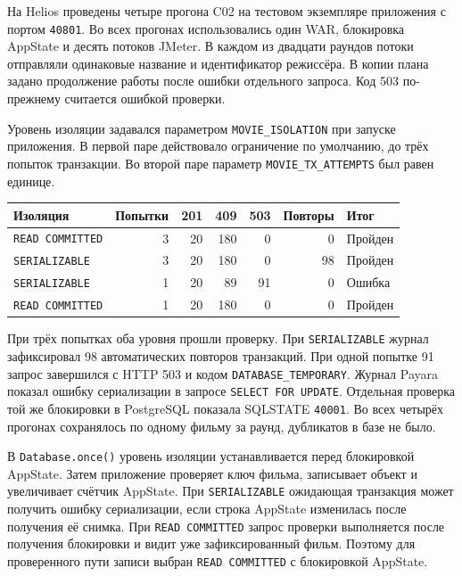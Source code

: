 На Helios проведены четыре прогона C02 на тестовом экземпляре приложения с портом \texttt{40801}. Во всех прогонах использовались один WAR, блокировка AppState и десять потоков JMeter. В каждом из двадцати раундов потоки отправляли одинаковые название и идентификатор режиссёра. В копии плана задано продолжение работы после ошибки отдельного запроса. Код 503 по-прежнему считается ошибкой проверки.

Уровень изоляции задавался параметром \texttt{MOVIE\_ISOLATION} при запуске приложения. В первой паре действовало ограничение по умолчанию, до трёх попыток транзакции. Во второй паре параметр \texttt{MOVIE\_TX\_ATTEMPTS} был равен единице.

\begin{center}
\begin{tabular}{lrrrrrl}
\toprule
Изоляция & Попытки & 201 & 409 & 503 & Повторы & Итог \\
\midrule
\texttt{READ COMMITTED} & 3 & 20 & 180 & 0 & 0 & Пройден \\
\texttt{SERIALIZABLE} & 3 & 20 & 180 & 0 & 98 & Пройден \\
\texttt{SERIALIZABLE} & 1 & 20 & 89 & 91 & 0 & Ошибка \\
\texttt{READ COMMITTED} & 1 & 20 & 180 & 0 & 0 & Пройден \\
\bottomrule
\end{tabular}
\end{center}

При трёх попытках оба уровня прошли проверку. При \texttt{SERIALIZABLE} журнал зафиксировал 98 автоматических повторов транзакций. При одной попытке 91 запрос завершился с HTTP 503 и кодом \texttt{DATABASE\_TEMPORARY}. Журнал Payara показал ошибку сериализации в запросе \texttt{SELECT FOR UPDATE}. Отдельная проверка той же блокировки в PostgreSQL показала SQLSTATE \texttt{40001}. Во всех четырёх прогонах сохранялось по одному фильму за раунд, дубликатов в базе не было.

В \texttt{Database.once()} уровень изоляции устанавливается перед блокировкой AppState. Затем приложение проверяет ключ фильма, записывает объект и увеличивает счётчик AppState. При \texttt{SERIALIZABLE} ожидающая транзакция может получить ошибку сериализации, если строка AppState изменилась после получения её снимка. При \texttt{READ COMMITTED} запрос проверки выполняется после получения блокировки и видит уже зафиксированный фильм. Поэтому для проверенного пути записи выбран \texttt{READ COMMITTED} с блокировкой AppState.
